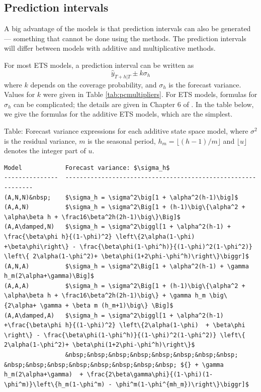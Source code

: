 \documentclass[]{book}
\begin{document}
\hypertarget{prediction-intervals}{%
\subsection*{Prediction intervals}\label{prediction-intervals}}

A big advantage of the models is that prediction intervals can also be generated --- something that cannot be done using the methods. The prediction intervals will differ between models with additive and multiplicative methods.

For most ETS models, a prediction interval can be written as
\[
  \hat{y}_{T+h|T} \pm k \sigma_h
\]
where \(k\) depends on the coverage probability, and \(\sigma_h\) is the forecast variance. Values for \(k\) were given in Table \ref{tab:pcmultipliers}. For ETS models, formulas for \(\sigma_h\) can be complicated; the details are given in Chapter 6 of \citet{expsmooth08}. In the table below, we give the formulas for the additive ETS models, which are the simplest.

Table: \label{tab:pitable}Forecast variance expressions for each additive state space model, where \(\sigma^2\) is the residual variance, \(m\) is the seasonal period, \(h_m = \lfloor(h-1)/m\rfloor\) and \(\lfloor u\rfloor\) denotes the integer part of \(u\).

\begin{verbatim}
Model            Forecast variance: $\sigma_h$
---------------  -------------------------------------------------------------
(A,N,N)&nbsp;    $\sigma_h = \sigma^2\big[1 + \alpha^2(h-1)\big]$
(A,A,N)          $\sigma_h = \sigma^2\Big[1 + (h-1)\big\{\alpha^2 + \alpha\beta h + \frac16\beta^2h(2h-1)\big\}\Big]$
(A,A\damped,N)   $\sigma_h = \sigma^2\biggl[1 + \alpha^2(h-1) + \frac{\beta\phi h}{(1-\phi)^2} \left\{2\alpha(1-\phi) +\beta\phi\right\} - \frac{\beta\phi(1-\phi^h)}{(1-\phi)^2(1-\phi^2)} \left\{ 2\alpha(1-\phi^2)+ \beta\phi(1+2\phi-\phi^h)\right\}\biggr]$                              
(A,N,A)          $\sigma_h = \sigma^2\Big[1 + \alpha^2(h-1) + \gamma h_m(2\alpha+\gamma)\Big]$  
(A,A,A)          $\sigma_h = \sigma^2\Big[1 + (h-1)\big\{\alpha^2 + \alpha\beta h + \frac16\beta^2h(2h-1)\big\} + \gamma h_m \big\{2\alpha+ \gamma + \beta m (h_m+1)\big\} \Big]$
(A,A\damped,A)   $\sigma_h = \sigma^2\biggl[1 + \alpha^2(h-1) +\frac{\beta\phi h}{(1-\phi)^2} \left\{2\alpha(1-\phi)  + \beta\phi \right\} - \frac{\beta\phi(1-\phi^h)}{(1-\phi)^2(1-\phi^2)} \left\{ 2\alpha(1-\phi^2)+ \beta\phi(1+2\phi-\phi^h)\right\}$
                 &nbsp;&nbsp;&nbsp;&nbsp;&nbsp;&nbsp;&nbsp;&nbsp; &nbsp;&nbsp;&nbsp;&nbsp;&nbsp;&nbsp;&nbsp;&nbsp; ${} + \gamma h_m(2\alpha+\gamma)  + \frac{2\beta\gamma\phi}{(1-\phi)(1-\phi^m)}\left\{h_m(1-\phi^m) - \phi^m(1-\phi^{mh_m})\right\}\biggr]$ 
\end{verbatim}
\end{document}
